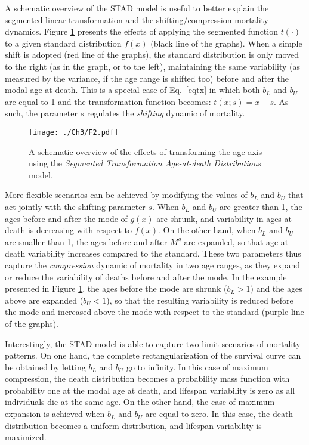 \documentclass[Thesis]{subfiles}
\begin{document}
A schematic overview of the STAD model is useful to better explain the segmented linear transformation and the shifting/compression mortality dynamics. Figure \ref{Fig:TransfExample} presents the effects of applying the segmented function $t(\cdot)$ to a given standard distribution $f(x)$ (black line of the graphs). When a simple shift is adopted (red line of the graphs), the standard distribution is only moved to the right (as in the graph, or to the left), maintaining the same variability (as measured by the variance, if the age range is shifted too) before and after the modal age at death. This is a special case of Eq.~\eqref{eqtx} in which both $b_{L}$ and $b_{U}$ are equal to 1 and the transformation function becomes: $t(x;s) = x - s$. As such, the parameter $s$ regulates the \textit{shifting} dynamic of mortality.

\begin{figure}[!ht]
	\begin{center}
		\texttt{[image: ./Ch3/F2.pdf]} 
		\caption{A schematic overview of the effects of transforming the
			age axis using the \emph{Segmented Transformation Age-at-death
			Distributions} model.\label{Fig:TransfExample}}    
	\end{center}
\end{figure}

More flexible scenarios can be achieved by modifying the values of $b_{L}$ and $b_{U}$ that act jointly with the shifting parameter $s$. When $b_{L}$ and $b_{U}$ are greater than 1, the ages before and after the mode of $g(x)$ are shrunk, and variability in ages at death is decreasing with respect to $f(x)$. On the other hand, when $b_{L}$ and $b_{U}$ are smaller than 1, the ages before and after $M^{g}$ are expanded, so that age at death variability increases compared to the standard. These two parameters thus capture the \textit{compression} dynamic of mortality in two age ranges, as they expand or reduce the variability of deaths before and after the mode. In the example presented in Figure \ref{Fig:TransfExample}, the ages before the mode are shrunk ($b_{L} > 1$) and the ages above are expanded ($b_{U} < 1$), so that the resulting variability is reduced before the mode and increased above the mode with respect to the standard (purple line of the graphs).  

Interestingly, the STAD model is able to capture two limit scenarios of mortality patterns. On one hand, the complete rectangularization of the survival curve can be obtained by letting $b_{L}$ and $b_{U}$ go to infinity. In this case of maximum compression, the death distribution becomes a probability mass function with probability one at the modal age at death, and lifespan variability is zero as all individuals die at the same age. On the other hand, the case of maximum expansion is achieved when $b_{L}$ and $b_{U}$ are equal to zero. In this case, the death distribution becomes a uniform distribution, and lifespan variability is maximized.
\end{document}
